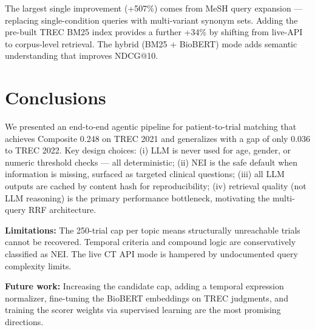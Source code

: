 \documentclass[10pt,twocolumn]{article}
\begin{document}
The largest single improvement (+507\%) comes from MeSH query expansion — replacing
single-condition queries with multi-variant synonym sets. Adding the pre-built TREC
BM25 index provides a further +34\% by shifting from live-API to corpus-level retrieval.
The hybrid (BM25 + BioBERT) mode adds semantic understanding that improves NDCG@10.

\section{Conclusions}
\label{sec:conclusions}

We presented an end-to-end agentic pipeline for patient-to-trial matching that achieves
Composite 0.248 on TREC 2021 and generalizes with a gap of only 0.036 to TREC 2022.
Key design choices: (i) LLM is never used for age, gender, or numeric threshold checks
— all deterministic; (ii) NEI is the safe default when information is missing, surfaced
as targeted clinical questions; (iii) all LLM outputs are cached by content hash for
reproducibility; (iv) retrieval quality (not LLM reasoning) is the primary performance
bottleneck, motivating the multi-query RRF architecture.

\textbf{Limitations:} The 250-trial cap per topic means structurally unreachable trials
cannot be recovered. Temporal criteria and compound logic are conservatively classified
as NEI. The live CT API mode is hampered by undocumented query complexity limits.

\textbf{Future work:} Increasing the candidate cap, adding a temporal expression
normalizer, fine-tuning the BioBERT embeddings on TREC judgments, and training the
scorer weights via supervised learning are the most promising directions.
\end{document}
